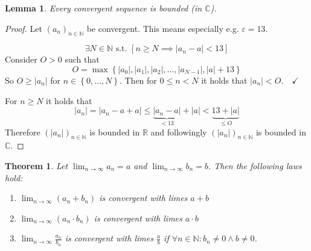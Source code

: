 \documentclass[a4paper,landscape,twocolumn]{article}
\newtheorem{theorem}{Theorem}
\newtheorem{lemma}{Lemma}
\newcommand\set[1]{\left\{#1\right\}}
\newcommand\abs[1]{\left|#1\right|}
\begin{document}
\begin{lemma}
  Every convergent sequence is bounded (in $\mathbb C$).
\end{lemma}

\begin{proof}
  Let $(a_n)_{n \in \mathbb N}$ be convergent.
  This means especially e.g. $\varepsilon = 13$.

  \[ \exists N \in \mathbb N \text{ s.t. } \left[n \geq N \implies \abs{a_n - a} < 13\right] \]
  Consider $O > 0$ such that
  \[ O = \max\set{\abs{a_0}, \abs{a_1}, \abs{a_2}, \ldots, \abs{a_{N-1}}, \abs{a} + 13} \]
  So $O \geq \abs{a_n}$ for $n \in \set{0, \dots, N}$.
  Then for $0 \leq n < N$ it holds that $\abs{a_n} < O. \quad\checkmark$

  For $n \geq N$ it holds that
  \[ \abs{a_n} = \abs{a_n - a + a} \leq \underbrace{\abs{a_n - a}}_{< 13} + \abs{a} < \underbrace{13 + \abs{a}}_{\leq O} \]
  Therefore $(\abs{a_n})_{n \in \mathbb N}$ is bounded in $\mathbb R$
  and followingly $(\abs{a_n})_{n \in \mathbb N}$ is bounded in $\mathbb C$.
\end{proof}

\begin{theorem}
  Let $\lim_{n \to \infty} a_n = a$ and $\lim_{n \to \infty} b_n = b$.
  Then the following laws hold:
  \begin{enumerate}
    \item $\lim_{n \to \infty} (a_n + b_n)$ is convergent with limes $a + b$
    \item $\lim_{n \to \infty} (a_n \cdot b_n)$ is convergent with limes $a \cdot b$
    \item $\lim_{n \to \infty} \frac{a_n}{b_n}$ is convergent with limes $\frac{a}{b}$ if $ \forall n \in \mathbb N: b_n \neq 0 \land b \neq 0$.
  \end{enumerate}
\end{theorem}
\end{document}
